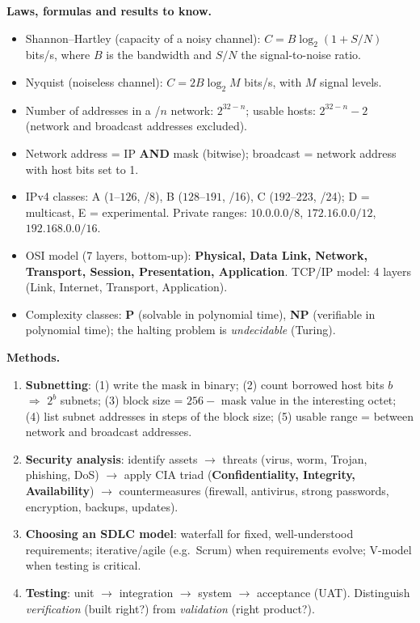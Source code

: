 \documentclass[11pt]{article}
\begin{document}
\begin{bilan}
\textbf{Laws, formulas and results to know.}
\begin{itemize}
\item Shannon--Hartley (capacity of a noisy channel): $C = B\log_2(1 + S/N)$ bits/s, where $B$ is the bandwidth and $S/N$ the signal-to-noise ratio.
\item Nyquist (noiseless channel): $C = 2B\log_2 M$ bits/s, with $M$ signal levels.
\item Number of addresses in a /$n$ network: $2^{32-n}$; usable hosts: $2^{32-n}-2$ (network and broadcast addresses excluded).
\item Network address = IP \textbf{AND} mask (bitwise); broadcast = network address with host bits set to 1.
\item IPv4 classes: A ($1$--$126$, /8), B ($128$--$191$, /16), C ($192$--$223$, /24); D = multicast, E = experimental. Private ranges: $10.0.0.0/8$, $172.16.0.0/12$, $192.168.0.0/16$.
\item OSI model (7 layers, bottom-up): \textbf{Physical, Data Link, Network, Transport, Session, Presentation, Application}. TCP/IP model: 4 layers (Link, Internet, Transport, Application).
\item Complexity classes: \textbf{P} (solvable in polynomial time), \textbf{NP} (verifiable in polynomial time); the halting problem is \emph{undecidable} (Turing).
\end{itemize}

\textbf{Methods.}
\begin{enumerate}
\item \textbf{Subnetting}: (1) write the mask in binary; (2) count borrowed host bits $b$ $\Rightarrow$ $2^b$ subnets; (3) block size = $256 - $ mask value in the interesting octet; (4) list subnet addresses in steps of the block size; (5) usable range = between network and broadcast addresses.
\item \textbf{Security analysis}: identify assets $\rightarrow$ threats (virus, worm, Trojan, phishing, DoS) $\rightarrow$ apply CIA triad (\textbf{Confidentiality, Integrity, Availability}) $\rightarrow$ countermeasures (firewall, antivirus, strong passwords, encryption, backups, updates).
\item \textbf{Choosing an SDLC model}: waterfall for fixed, well-understood requirements; iterative/agile (e.g.\ Scrum) when requirements evolve; V-model when testing is critical.
\item \textbf{Testing}: unit $\rightarrow$ integration $\rightarrow$ system $\rightarrow$ acceptance (UAT). Distinguish \emph{verification} (built right?) from \emph{validation} (right product?).
\end{enumerate}


\end{bilan}
\end{document}
